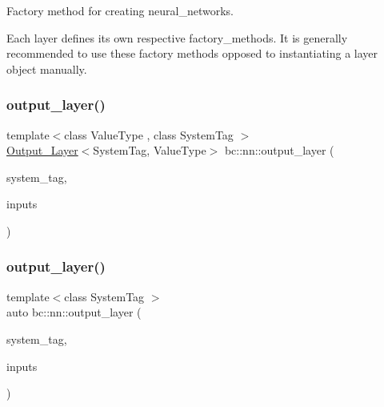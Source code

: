 Factory method for creating neural\+\_\+networks. 

Each layer defines its own respective factory\+\_\+methods. It is generally recommended to use these factory methods opposed to instantiating a layer object manually. \mbox{\label{namespacebc_1_1nn_ae84edaf9ec82c2af64a8f3aa54b4828e}} 
\subsubsection{\texorpdfstring{output\+\_\+layer()}{output\_layer()}\hspace{0.1cm}{\footnotesize\ttfamily [1/3]}}
{\footnotesize\ttfamily template$<$class Value\+Type , class System\+Tag $>$ \\
\hyperlink{structbc_1_1nn_1_1Output__Layer}{Output\+\_\+\+Layer}$<$System\+Tag, Value\+Type$>$ bc\+::nn\+::output\+\_\+layer (\begin{DoxyParamCaption}\item[{System\+Tag}]{system\+\_\+tag,  }\item[{int}]{inputs }\end{DoxyParamCaption})}

\mbox{\label{namespacebc_1_1nn_abbaad8d9e2085fa6e976f944b7e9e894}} 
\subsubsection{\texorpdfstring{output\+\_\+layer()}{output\_layer()}\hspace{0.1cm}{\footnotesize\ttfamily [2/3]}}
{\footnotesize\ttfamily template$<$class System\+Tag $>$ \\
auto bc\+::nn\+::output\+\_\+layer (\begin{DoxyParamCaption}\item[{System\+Tag}]{system\+\_\+tag,  }\item[{int}]{inputs }\end{DoxyParamCaption})}

\mbox{\label{namespacebc_1_1nn_a56a762fa913ca0ac7399cae1713b9d5a}} 
